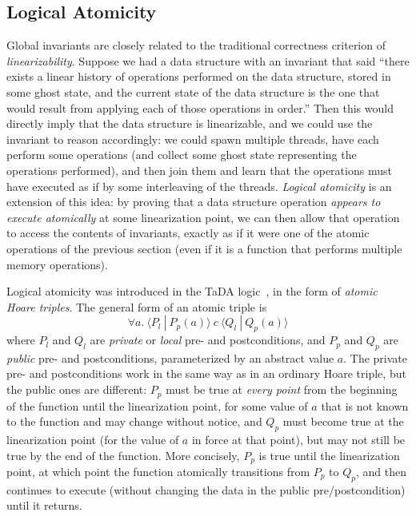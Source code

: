 \documentclass[11pt]{article} %
\begin{document}
\subsection{Logical Atomicity}
Global invariants are closely related to the traditional correctness criterion of \emph{linearizability}. Suppose we had a data structure with an invariant that said ``there exists a linear history of operations performed on the data structure, stored in some ghost state, and the current state of the data structure is the one that would result from applying each of those operations in order.'' Then this would directly imply that the data structure is linearizable, and we could use the invariant to reason accordingly: we could spawn multiple threads, have each perform some operations (and collect some ghost state representing the operations performed), and then join them and learn that the operations must have executed as if by some interleaving of the threads. \emph{Logical atomicity} is an extension of this idea: by proving that a data structure operation \emph{appears to execute atomically} at some linearization point, we can then allow that operation to access the contents of invariants, exactly as if it were one of the atomic operations of the previous section (even if it is a function that performs multiple memory operations).

Logical atomicity was introduced in the TaDA logic~\cite{tada}, in the form of \emph{atomic Hoare triples}. The general form of an atomic triple is $$\forall a.\ \langle P_l\ |\ P_p(a)\rangle\ c\ \langle Q_l\ |\ Q_p(a)\rangle$$
where $P_l$ and $Q_l$ are \emph{private} or \emph{local} pre- and postconditions, and $P_p$ and $Q_p$ are \emph{public} pre- and postconditions, parameterized by an abstract value $a$. The private pre- and postconditions work in the same way as in an ordinary Hoare triple, but the public ones are different: $P_p$ must be true at \emph{every point} from the beginning of the function until the linearization point, for some value of $a$ that is not known to the function and may change without notice, and $Q_p$ must become true at the linearization point (for the value of $a$ in force at that point), but may not still be true by the end of the function. More concisely, $P_p$ is true until the linearization point, at which point the function atomically transitions from $P_p$ to $Q_p$, and then continues to execute (without changing the data in the public pre/postcondition) until it returns.
\end{document}
